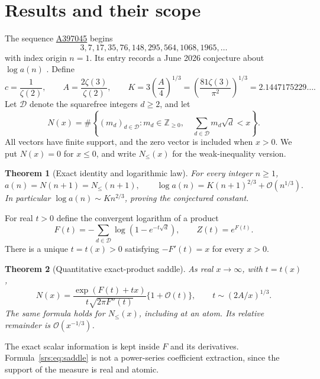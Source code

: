 \documentclass[11pt]{article}
\numberwithin{equation}{section}
\newtheorem{theorem}{Theorem}[section]
\theoremstyle{remark}\newtheorem{remark}[theorem]{Remark}
\newcommand{\Oh}{\mathcal O}
\newcommand{\Sf}{\mathcal D}
\newcommand{\Z}{\mathbb Z}
\begin{document}
\setcounter{tocdepth}{1}
\begingroup
\small
\setlength{\parskip}{0pt}
\tableofcontents
\endgroup
\clearpage

\section{Results and their scope}\label{srs:sec:results}
The sequence \href{https://oeis.org/A397045}{A397045} begins
\[
3,7,17,35,76,148,295,564,1068,1965,\ldots
\]
with index origin $n=1$. Its entry records a June 2026 conjecture about $\log a(n)$ \cite{OEIS}. Define
\begin{equation}
 c=\frac1{\zeta(2)},\qquad A=\frac{2\zeta(3)}{\zeta(2)},\qquad
 K=3\left(\frac A4\right)^{1/3}
   =\left(\frac{81\zeta(3)}{\pi^2}\right)^{1/3}
   =2.1447175229\ldots .\label{srs:eq:constants}
\end{equation}
Let $\Sf$ denote the squarefree integers $d\ge2$, and let
\begin{equation}
 N(x)=\#\left\{(m_d)_{d\in\Sf}:m_d\in\Z_{\ge0},\quad
       \sum_{d\in\Sf}m_d\sqrt d<x\right\}.\label{srs:eq:N}
\end{equation}
All vectors have finite support, and the zero vector is included when $x>0$.
We put $N(x)=0$ for $x\le0$, and write $N_{\le}(x)$ for the weak-inequality version.

\begin{theorem}[Exact identity and logarithmic law]\label{srs:thm:log}
For every integer $n\ge1$,
\begin{equation}
 a(n)=N(n+1)=N_{\le}(n+1),\qquad
 \log a(n)=K(n+1)^{2/3}+\Oh(n^{1/3}).\label{srs:eq:loglaw}
\end{equation}
In particular $\log a(n)\sim Kn^{2/3}$, proving the conjectured constant.
\end{theorem}

For real $t>0$ define the convergent logarithm of a product
\begin{equation}
 F(t)=-\sum_{d\in\Sf}\log(1-e^{-t\sqrt d}),\qquad Z(t)=e^{F(t)}.
 \label{srs:eq:F}
\end{equation}
There is a unique $t=t(x)>0$ satisfying $-F'(t)=x$ for every $x>0$.

\begin{theorem}[Quantitative exact-product saddle]\label{srs:thm:saddle}
As real $x\to\infty$, with $t=t(x)$,
\begin{equation}
 N(x)=\frac{\exp(F(t)+tx)}{t\sqrt{2\pi F''(t)}}
 \{1+\Oh(t)\},
 \qquad t\sim (2A/x)^{1/3}.\label{srs:eq:saddle}
\end{equation}
The same formula holds for $N_{\le}(x)$, including at an atom. Its relative remainder is $\Oh(x^{-1/3})$.
\end{theorem}
The exact scalar information is kept inside $F$ and its derivatives. Formula~\eqref{srs:eq:saddle} is not a power-series coefficient extraction, since the support of the measure is real and atomic.
\end{document}

